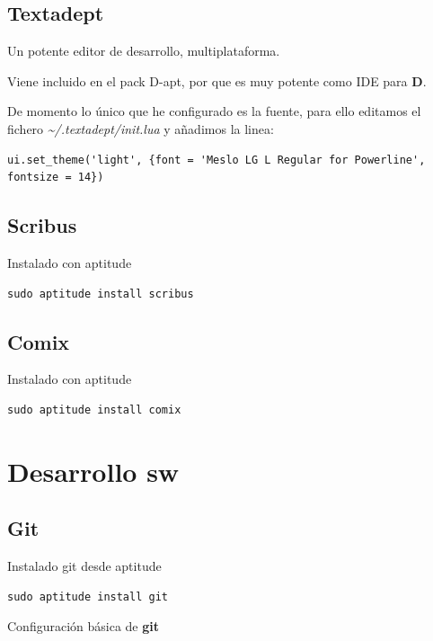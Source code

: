 \documentclass[12pt,spanish,]{scrartcl}
\begin{document}
\subsection{Textadept}\label{textadept}

Un potente editor de desarrollo, multiplataforma.

Viene incluido en el pack D-apt, por que es muy potente como IDE para
\textbf{D}.

De momento lo único que he configurado es la fuente, para ello editamos
el fichero \emph{\textasciitilde{}/.textadept/init.lua} y añadimos la
linea:

\begin{verbatim}
ui.set_theme('light', {font = 'Meslo LG L Regular for Powerline', fontsize = 14})
\end{verbatim}

\subsection{Scribus}\label{scribus}

Instalado con aptitude

\begin{verbatim}
sudo aptitude install scribus
\end{verbatim}

\subsection{Comix}\label{comix}

Instalado con aptitude

\begin{verbatim}
sudo aptitude install comix
\end{verbatim}

\section{Desarrollo sw}\label{desarrollo-sw}

\subsection{Git}\label{git}

Instalado git desde aptitude

\begin{verbatim}
sudo aptitude install git
\end{verbatim}

Configuración básica de \textbf{git}
\end{document}
